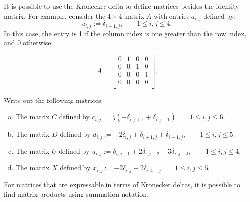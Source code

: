 It is possible to use the Kronecker delta to define matrices besides the identity matrix. For example, consider the $4 \times 4$ matrix $A$ with entries $a_{i,j}$ defined by:
\[  a_{i,j} := \delta_{i+1,j}, \qquad 1 \le i,j \le 4.\]
In this case, the entry is 1 if the column index is one greater than the row index, and 0 otherwise:

\[A = \left[ \begin{array}{ccccc}
0 & 1   & 0 & 0 \\
0 & 0  & 1 & 0  \\
0 & 0  &  0 & 1 \\
0 & 0  & 0 & 0  \\
 \end{array} \right]. \]

\begin{exercise}{}
Write out the following   matrices:
\begin{enumerate}[(a)]
\item
The matrix $C$ defined by 
$\displaystyle  c_{i,j} := \frac{1}{2} (-\delta_{i,j+1}+\delta_{i,j-1})  \qquad 1 \le i,j \le 6$.
\item
The matrix $D$ defined by 
$\displaystyle  d_{i,j} := -2\delta_{i,j} + \delta_{i+1,j} + \delta_{i-1,j}, \qquad 1 \le i,j \le 5$.
\item 
The matrix $U$ defined by 
$\displaystyle  u_{i,j} := \delta_{i,j-1} + 2\delta_{i,j-2} + 3\delta_{i,j-3}, \qquad 1 \le i,j \le 4$.
\item
The matrix $X$ defined by 
$\displaystyle  x_{i,j} := -2\delta_{i,j} + 2\delta_{i,4-j}  \qquad 1 \le i,j \le 5$.
\end{enumerate}
\end{exercise}

For matrices that are expressable in terms of Kronecker deltas, it is possible to find matrix products using summation notation.


